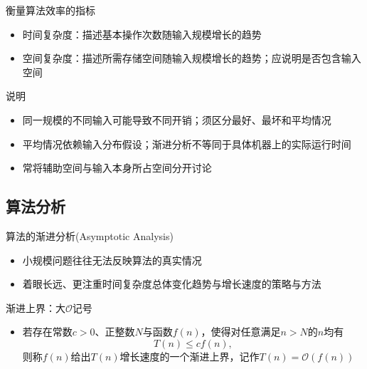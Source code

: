 \begin{frame}{\insertsubsectionhead}
	\begin{block}{衡量算法效率的指标}
		\begin{itemize}
			\item 时间复杂度：描述基本操作次数随输入规模增长的趋势
			\item 空间复杂度：描述所需存储空间随输入规模增长的趋势；应说明是否包含输入空间
		\end{itemize}
	\end{block}
	\pause
	\begin{exampleblock}{说明}
		\begin{itemize}
			\item 同一规模的不同输入可能导致不同开销；须区分最好、最坏和平均情况
			\item 平均情况依赖输入分布假设；渐进分析不等同于具体机器上的实际运行时间
			\item 常将辅助空间与输入本身所占空间分开讨论
		\end{itemize}
	\end{exampleblock}
\end{frame}

\subsection{算法分析}

\begin{frame}{\insertsubsectionhead}
	\begin{block}{算法的渐进分析(Asymptotic Analysis)}
		\begin{itemize}
			\item 小规模问题往往无法反映算法的真实情况
			\item 着眼\alert{长远}、更注重时间复杂度总体变化\alert{趋势}与增长速度的策略与方法
		\end{itemize}
	\end{block}
\end{frame}

\begin{frame}{\insertsubsectionhead}
	\begin{block}{渐进上界：大$\mathcal{O}$记号}
		\begin{itemize}
			\item 若存在常数$c>0$、正整数$N$与函数$f(n)$，使得对任意满足$n>N$的$n$均有
			      \[
				      T(n) \leq cf(n),
			      \]
			      则称$f(n)$给出$T(n)$增长速度的一个\alert{渐进上界}，记作$T(n)=\mathcal{O}(f(n))$
		\end{itemize}
	\end{block}
\end{frame}

